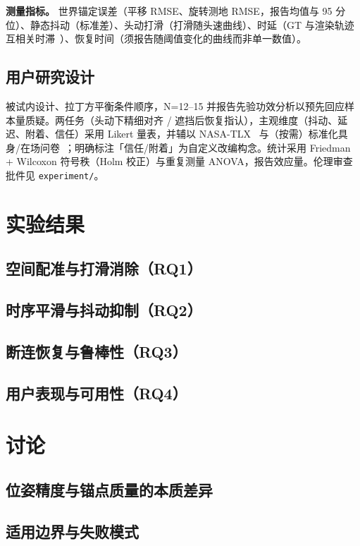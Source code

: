 \documentclass[review]{vgtc}
\begin{document}
\noindent\textbf{测量指标。} 世界锚定误差（平移 RMSE、旋转测地 RMSE，报告均值与 95 分位）、静态抖动（标准差）、头动打滑（打滑随头速曲线）、时延（GT 与渲染轨迹互相关时滞~\cite{diluca2010latency}）、恢复时间（须报告随阈值变化的曲线而非单一数值）。

\subsection{用户研究设计}
被试内设计、拉丁方平衡条件顺序，N=12--15 并报告先验功效分析以预先回应样本量质疑。两任务（头动下精细对齐 / 遮挡后恢复指认），主观维度（抖动、延迟、附着、信任）采用 Likert 量表，并辅以 NASA-TLX~\cite{hart1988nasatlx} 与（按需）标准化具身/在场问卷~\cite{gonzalezfranco2018embodiment}；明确标注「信任/附着」为自定义改编构念。统计采用 Friedman + Wilcoxon 符号秩（Holm 校正）与重复测量 ANOVA，报告效应量。伦理审查批件见 \texttt{experiment/}。

\section{实验结果}
\subsection{空间配准与打滑消除（RQ1）}
\subsection{时序平滑与抖动抑制（RQ2）}
\subsection{断连恢复与鲁棒性（RQ3）}
\subsection{用户表现与可用性（RQ4）}

\section{讨论}
\subsection{位姿精度与锚点质量的本质差异}
\subsection{适用边界与失败模式}
\end{document}
